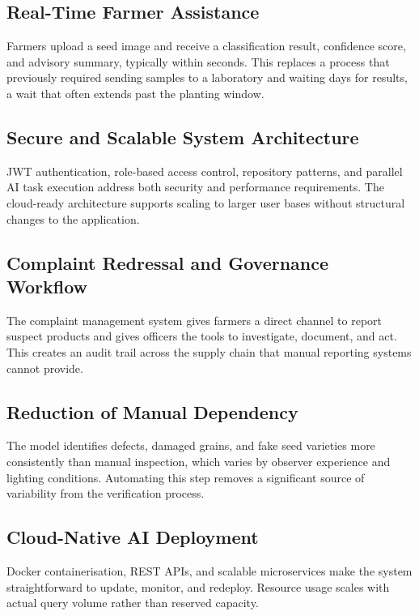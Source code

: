 \subsection{Real-Time Farmer Assistance}

Farmers upload a seed image and receive a classification result, confidence score, and advisory summary, typically within seconds. This replaces a process that previously required sending samples to a laboratory and waiting days for results, a wait that often extends past the planting window.

\subsection{Secure and Scalable System Architecture}

JWT authentication, role-based access control, repository patterns, and parallel AI task execution address both security and performance requirements. The cloud-ready architecture supports scaling to larger user bases without structural changes to the application.

\subsection{Complaint Redressal and Governance Workflow}

The complaint management system gives farmers a direct channel to report suspect products and gives officers the tools to investigate, document, and act. This creates an audit trail across the supply chain that manual reporting systems cannot provide.

\subsection{Reduction of Manual Dependency}

The model identifies defects, damaged grains, and fake seed varieties more consistently than manual inspection, which varies by observer experience and lighting conditions. Automating this step removes a significant source of variability from the verification process.

\subsection{Cloud-Native AI Deployment}

Docker containerisation, REST APIs, and scalable microservices make the system straightforward to update, monitor, and redeploy. Resource usage scales with actual query volume rather than reserved capacity.

